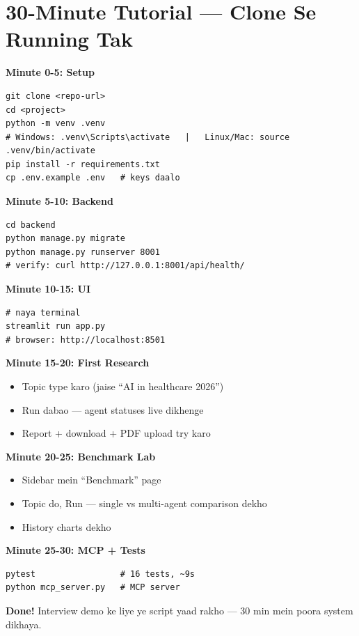 \section{30-Minute Tutorial --- Clone Se Running Tak}

\begin{codestorybox}
\textbf{Minute 0-5: Setup}
\begin{lstlisting}[style=bashstyle]
git clone <repo-url>
cd <project>
python -m venv .venv
# Windows: .venv\Scripts\activate   |   Linux/Mac: source .venv/bin/activate
pip install -r requirements.txt
cp .env.example .env   # keys daalo
\end{lstlisting}

\textbf{Minute 5-10: Backend}
\begin{lstlisting}[style=bashstyle]
cd backend
python manage.py migrate
python manage.py runserver 8001
# verify: curl http://127.0.0.1:8001/api/health/
\end{lstlisting}

\textbf{Minute 10-15: UI}
\begin{lstlisting}[style=bashstyle]
# naya terminal
streamlit run app.py
# browser: http://localhost:8501
\end{lstlisting}

\textbf{Minute 15-20: First Research}
\begin{itemize}
\item Topic type karo (jaise ``AI in healthcare 2026'')
\item Run dabao --- agent statuses live dikhenge
\item Report + download + PDF upload try karo
\end{itemize}

\textbf{Minute 20-25: Benchmark Lab}
\begin{itemize}
\item Sidebar mein ``Benchmark'' page
\item Topic do, Run --- single vs multi-agent comparison dekho
\item History charts dekho
\end{itemize}

\textbf{Minute 25-30: MCP + Tests}
\begin{lstlisting}[style=bashstyle]
pytest                 # 16 tests, ~9s
python mcp_server.py   # MCP server
\end{lstlisting}

\textbf{Done!} Interview demo ke liye ye script yaad rakho --- 30 min mein poora system dikhaya.
\end{codestorybox}

